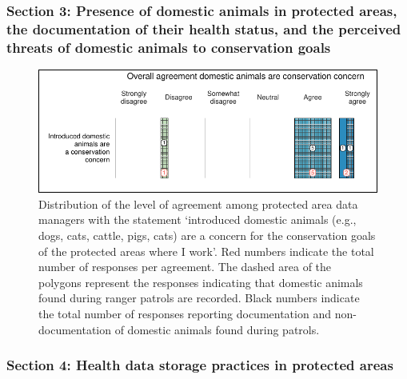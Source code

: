 \documentclass[
  letterpaper,
  DIV=11,
  numbers=noendperiod]{scrartcl}
\begin{document}
\hypertarget{section-3-presence-of-domestic-animals-in-protected-areas-the-documentation-of-their-health-status-and-the-perceived-threats-of-domestic-animals-to-conservation-goals}{%
\subsubsection{Section 3: Presence of domestic animals in protected
areas, the documentation of their health status, and the perceived
threats of domestic animals to conservation
goals}\label{section-3-presence-of-domestic-animals-in-protected-areas-the-documentation-of-their-health-status-and-the-perceived-threats-of-domestic-animals-to-conservation-goals}}

\begin{figure}[H]

{\centering \includegraphics{Appendix_final_files/figure-pdf/plot appendix section 3-1.pdf}

}

\caption{Distribution of the level of agreement among protected area
data managers with the statement `introduced domestic animals (e.g.,
dogs, cats, cattle, pigs, cats) are a concern for the conservation goals
of the protected areas where I work'. Red numbers indicate the total
number of responses per agreement. The dashed area of the polygons
represent the responses indicating that domestic animals found during
ranger patrols are recorded. Black numbers indicate the total number of
responses reporting documentation and non-documentation of domestic
animals found during patrols.}

\end{figure}

\hypertarget{section-4-health-data-storage-practices-in-protected-areas}{%
\subsubsection{Section 4: Health data storage practices in protected
areas}\label{section-4-health-data-storage-practices-in-protected-areas}}
\end{document}
